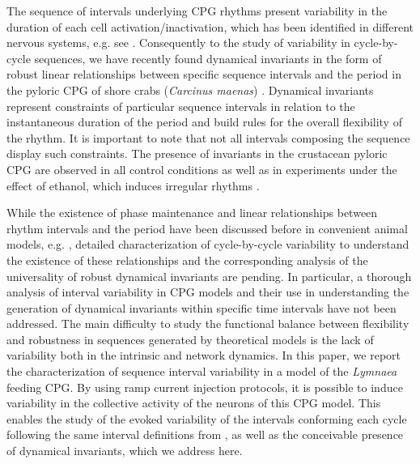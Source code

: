 The sequence of intervals underlying CPG rhythms present variability in the duration of each cell activation/inactivation, which has been identified in different nervous systems, e.g. see \cite{reyes_artificial_2008,elliott_temporal_1991,martinez_short-term_2019}. Consequently to the study of variability in cycle-by-cycle sequences, we have recently found dynamical invariants in the form of robust linear relationships between specific sequence intervals and the period in the  pyloric CPG of shore crabs (\textit{Carcinus maenas}) \cite{elices_robust_2019}. Dynamical invariants represent constraints of particular sequence intervals in relation to the instantaneous duration of the period and build rules for the overall flexibility of the rhythm. It is important to note that not all intervals composing the sequence display such constraints. The presence of invariants in the crustacean pyloric CPG are observed in all control conditions as well as in experiments under the effect of ethanol, which induces irregular rhythms \cite{elices_robust_2019}. 



While the existence of phase maintenance and linear relationships between rhythm intervals and the period have been discussed before in convenient animal models, e.g. \cite{grillner_generation_1976,Hooper1997a,vavoulis_dynamic_2007}, detailed characterization of cycle-by-cycle variability to understand the existence of these relationships and the corresponding analysis of the universality of robust dynamical invariants are pending.
In particular, a thorough analysis of interval variability in CPG models and their use in understanding the generation of dynamical invariants within specific time intervals have not been addressed. The main difficulty to study the functional balance between flexibility and robustness in sequences generated by theoretical models is the lack of variability both in the intrinsic and network dynamics. In this paper, we report the characterization of sequence interval variability in a model of the \textit{Lymnaea} feeding CPG.  By using ramp current injection protocols, it is possible to induce variability in the collective activity of the neurons of this CPG model. This enables the study of the evoked variability of the intervals conforming each cycle following the same interval definitions from \cite{elices_robust_2019}, as well as the conceivable presence of dynamical invariants, which we address here. 

